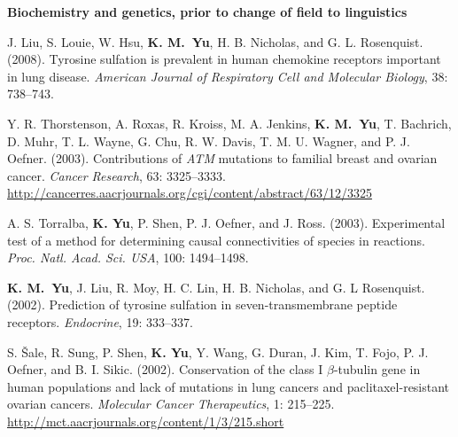 \documentclass[10pt]{article}
\newcommand{\blankline}{\quad\pagebreak[3]}
\newcommand{\halfblankline}{\quad\vspace{-0.5\baselineskip}\pagebreak[3]}
\begin{document}
\blankline

\blankline

\textbf{Biochemistry and genetics, prior to change of field to linguistics} \hfill

\halfblankline

\begin{bibenum}
    \item  J. Liu, S. Louie, W. Hsu, \textbf{K. M.~Yu},
      H. B. Nicholas, and G. L. Rosenquist. (2008). Tyrosine
        sulfation is prevalent in human chemokine receptors important
        in lung disease. \emph{American Journal of Respiratory Cell and Molecular Biology}, 38:
      738--743. 

      \item Y. R. Thorstenson, A. Roxas, R. Kroiss, M. A. Jenkins,
        \textbf{K. M.~Yu}, T. Bachrich, D.  Muhr, T. L. Wayne, G. Chu,
        R. W. Davis, T. M. U. Wagner, and P. J. Oefner. (2003).
        Contributions of \textit{ATM} mutations to familial breast and
        ovarian cancer. \emph{Cancer Research}, 63:
        3325--3333. \url{http://cancerres.aacrjournals.org/cgi/content/abstract/63/12/3325}

    \item A. S. Torralba, \textbf{K. Yu}, P. Shen, P. J. Oefner, and
      J. Ross. (2003). Experimental
        test of a method for determining causal connectivities of
        species in reactions. \textit{Proc. Natl. Acad. Sci. USA},
      100: 1494--1498. 

    \item \textbf{K. M.~Yu}, J. Liu, R. Moy, H. C. Lin,
      H. B. Nicholas, and G. L Rosenquist. (2002). Prediction of
      tyrosine sulfation in seven-transmembrane peptide receptors.
    \emph{Endocrine}, 19: 333--337. 

    \item S. \v{S}ale, R. Sung, P. Shen, \textbf{K. Yu}, Y. Wang,
      G. Duran, J. Kim, T. Fojo, P. J. Oefner, and
      B. I. Sikic. (2002). Conservation
        of the class I $\beta$-tubulin gene in human populations and
        lack of mutations in lung cancers and paclitaxel-resistant
        ovarian cancers. \emph{Molecular Cancer Therapeutics}, 1:
        215--225. \url{http://mct.aacrjournals.org/content/1/3/215.short}

\end{bibenum}

\vspace{0.1in}
\end{document}
